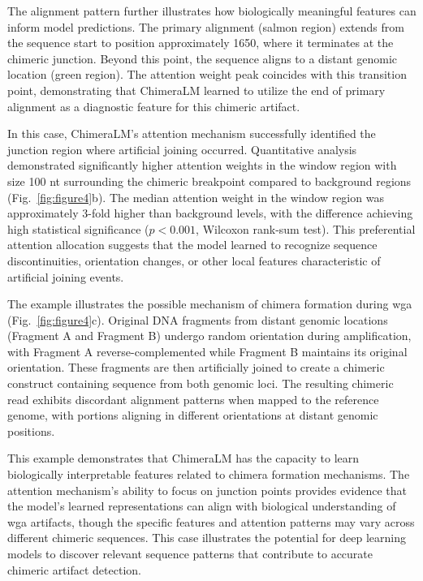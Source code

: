 \documentclass[pdflatex,sn-nature]{sn-jnl}%
\theoremstyle{thmstyleone}%
\theoremstyle{thmstyletwo}%
\theoremstyle{thmstylethree}%
\begin{document}
The alignment pattern further illustrates how biologically meaningful features can inform model predictions.
The primary alignment (salmon region) extends from the sequence start to position approximately 1650, where it terminates at the chimeric junction.
Beyond this point, the sequence aligns to a distant genomic location (green region).
The attention weight peak coincides with this transition point, demonstrating that ChimeraLM learned to utilize the end of primary alignment as a diagnostic feature for this chimeric artifact.

In this case, ChimeraLM's attention mechanism successfully identified the junction region where artificial joining occurred.
Quantitative analysis demonstrated significantly higher attention weights in the window region with size 100 nt surrounding the chimeric breakpoint compared to background regions (Fig.~\ref{fig:figure4}b).
The median attention weight in the window region was approximately 3-fold higher than background levels, with the difference achieving high statistical significance ($p < 0.001$, Wilcoxon rank-sum test).
This preferential attention allocation suggests that the model learned to recognize sequence discontinuities, orientation changes, or other local features characteristic of artificial joining events.

The example illustrates the possible mechanism of chimera formation during \gls{wga} (Fig.~\ref{fig:figure4}c).
Original DNA fragments from distant genomic locations (Fragment A and Fragment B) undergo random orientation during amplification, with Fragment A reverse-complemented while Fragment B maintains its original orientation.
These fragments are then artificially joined to create a chimeric construct containing sequence from both genomic loci.
The resulting chimeric read exhibits discordant alignment patterns when mapped to the reference genome, with portions aligning in different orientations at distant genomic positions.

This example demonstrates that ChimeraLM has the capacity to learn biologically interpretable features related to chimera formation mechanisms.
The attention mechanism's ability to focus on junction points provides evidence that the model's learned representations can align with biological understanding of \gls{wga} artifacts, though the specific features and attention patterns may vary across different chimeric sequences.
This case illustrates the potential for deep learning models to discover relevant sequence patterns that contribute to accurate chimeric artifact detection.
\end{document}
